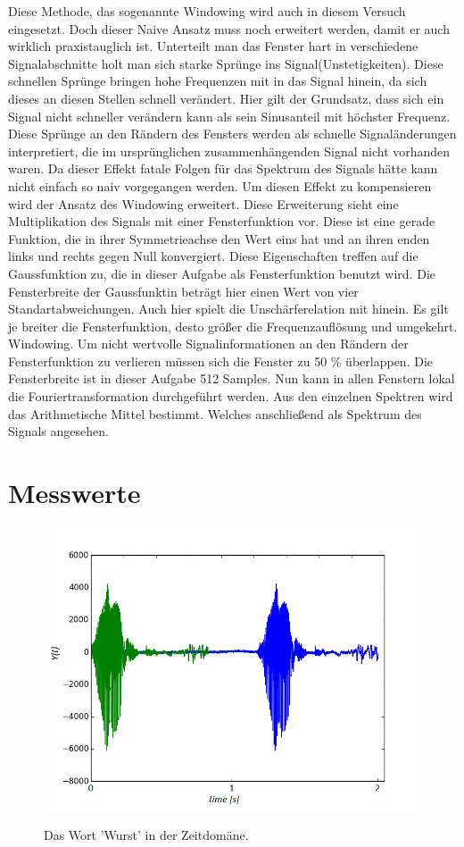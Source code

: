 Diese Methode, das sogenannte Windowing wird auch in diesem Versuch eingesetzt. Doch dieser Naive Ansatz muss noch erweitert werden, damit er auch wirklich praxistauglich ist. Unterteilt man das Fenster hart in verschiedene Signalabschnitte holt man sich starke Sprünge ins Signal(Unstetigkeiten). Diese schnellen Sprünge bringen hohe Frequenzen mit in das Signal hinein, da sich dieses an diesen Stellen schnell verändert. Hier gilt der Grundsatz, dass sich ein Signal nicht schneller verändern kann als sein Sinusanteil mit höchster Frequenz.
Diese Sprünge an den Rändern des Fensters werden als schnelle Signaländerungen interpretiert, die im ursprünglichen zusammenhängenden Signal nicht vorhanden waren.
Da dieser Effekt fatale Folgen für das Spektrum des Signals hätte kann nicht einfach so naiv vorgegangen werden.
Um diesen Effekt zu kompensieren wird der Ansatz des Windowing erweitert. Diese Erweiterung sieht eine Multiplikation des Signals mit einer Fensterfunktion vor. Diese ist eine gerade Funktion, die in ihrer Symmetrieachse den Wert eins hat und an ihren enden links und rechts gegen Null konvergiert. Diese Eigenschaften treffen auf die Gaussfunktion zu, die in dieser Aufgabe als Fensterfunktion benutzt wird. Die Fensterbreite der Gaussfunktin beträgt hier einen Wert von vier Standartabweichungen.
Auch hier spielt die Unschärferelation mit hinein. Es gilt je breiter die Fensterfunktion, desto größer die Frequenzauflösung und umgekehrt. \cite[S.21]{Franz2015c} Windowing. Um nicht wertvolle Signalinformationen an den Rändern der Fensterfunktion zu verlieren müssen sich die Fenster zu 50 \% überlappen. Die Fensterbreite ist in dieser Aufgabe 512 Samples. 
Nun kann in allen Fenstern lokal die Fouriertransformation durchgeführt werden. Aus den einzelnen Spektren wird das Arithmetische Mittel bestimmt. Welches anschließend als Spektrum des Signals angesehen.

\newpage
\section{Messwerte}
\label{chap:VERSUCH_1_MESSWERTE}
\begin{figure}[H]
\includegraphics[width=\textwidth]{media/triggertest.png}
\label{fig:Wurst_Triggered}
\caption{Das Wort 'Wurst' in der Zeitdomäne.}
\end{figure}

